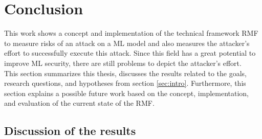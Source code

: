 \section{Conclusion}
\label{sec:conclusion}

This work shows a concept and implementation of the technical framework RMF to measure risks of an attack on a ML model and also measures the attacker's effort to successfully execute this attack. Since this field has a great potential to improve ML security, there are still problems to depict the attacker's effort. \\
This section summarizes this thesis, discusses the results related to the goals, research questions, and hypotheses from section \ref{sec:intro}. Furthermore, this section explains a possible future work based on the concept, implementation, and evaluation of the current state of the RMF.

\subsection{Discussion of the results}

